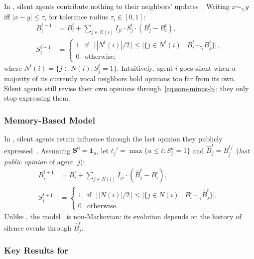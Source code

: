 In \SOMminus, silent agents contribute nothing to their neighbors'
updates~\cite{aranda2024sound}. Writing $x\sim_{\tau_i}y$ iff
$|x-y|\le\tau_i$ for tolerance radius $\tau_i\in[0,1]$:
\begin{align}
  B_i^{t+1} &= B_i^t
    + \sum_{j\in N(i)}I_{ji}\cdot S_j^t\cdot(B_j^t-B_i^t),
  \label{eq:som-minus-b}\\
  S_i^{t+1} &=
  \begin{cases}
    1 & \text{if }\;\bigl\lceil|N^t(i)|/2\bigr\rceil
        \le\bigl|\{j\in N^t(i)\mid B_i^t\sim_{\tau_i}B_j^t\}\bigr|,\\
    0 & \text{otherwise,}
  \end{cases}
  \label{eq:som-minus-s}
\end{align}
where $N^t(i)=\{j\in N(i):S_j^t=1\}$.
Intuitively, agent $i$ goes silent when a majority of its currently
vocal neighbors hold opinions too far from its own. Silent agents still
revise their own opinions through~\eqref{eq:som-minus-b}; they only stop
expressing them.

\subsubsection{Memory-Based Model \texorpdfstring{\SOMplus}{SOM+}}
\label{sec:som-plus}

In \SOMplus, silent agents retain influence through the last opinion
they publicly expressed~\cite{aranda2024sound}.
Assuming $\mathbf{S}^0=\mathbf{1}_n$, let
$t_j'=\max\{u\le t:S_j^u=1\}$ and
$\hat{B}_j^t=B_j^{t_j'}$ (\emph{last public opinion} of agent~$j$):
\begin{align}
  B_i^{t+1} &= B_i^t
    + \sum_{j\in N(i)}I_{ji}\cdot(\hat{B}_j^t-B_i^t),
  \label{eq:som-plus-b}\\
  S_i^{t+1} &=
  \begin{cases}
    1 & \text{if }\;\bigl\lceil|N(i)|/2\bigr\rceil
        \le\bigl|\{j\in N(i)\mid B_i^t\sim_{\tau_i}\hat{B}_j^t\}\bigr|,\\
    0 & \text{otherwise.}
  \end{cases}
  \label{eq:som-plus-s}
\end{align}
Unlike \SOMminus, the model \SOMplus\ is non-Markovian: its evolution
depends on the history of silence events through $\hat{B}_j^t$.

\subsubsection{Key Results for \texorpdfstring{\SOMminus}{SOM-}}
\label{sec:som-results}

